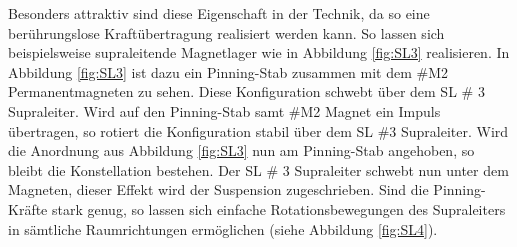 \noindent
Besonders attraktiv sind diese Eigenschaft in der Technik,
da so eine berührungslose Kraftübertragung realisiert werden kann. So lassen sich
beispielsweise supraleitende Magnetlager wie in Abbildung \ref{fig:SL3} realisieren.
In Abbildung \ref{fig:SL3} ist dazu ein Pinning-Stab zusammen mit dem \#M2
Permanentmagneten zu sehen. Diese Konfiguration schwebt über dem SL \# 3 Supraleiter.
Wird auf den Pinning-Stab samt \#M2 Magnet ein Impuls übertragen, so rotiert die Konfiguration
stabil über dem SL \#3 Supraleiter. Wird die Anordnung aus Abbildung \ref{fig:SL3} nun
am Pinning-Stab angehoben, so bleibt die Konstellation bestehen. Der SL \# 3 Supraleiter
schwebt nun unter dem Magneten, dieser Effekt wird der Suspension zugeschrieben.
Sind die Pinning-Kräfte stark genug, so lassen sich einfache Rotationsbewegungen
des Supraleiters in sämtliche Raumrichtungen ermöglichen (siehe Abbildung \ref{fig:SL4}).

